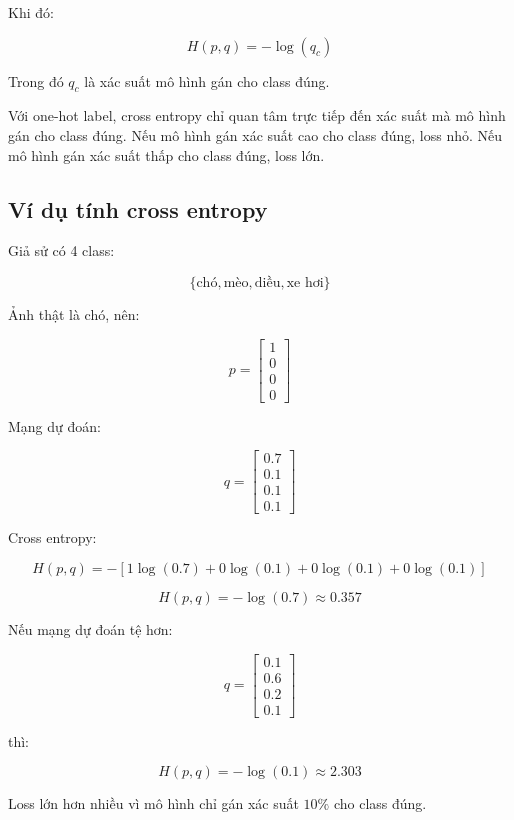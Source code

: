 Khi đó:

\[
    H(p,q) = -\log(q_c)
\]

Trong đó $q_c$ là xác suất mô hình gán cho class đúng.

\begin{ghinho}
Với one-hot label, cross entropy chỉ quan tâm trực tiếp đến xác suất mà mô hình gán cho class đúng. Nếu mô hình gán xác suất cao cho class đúng, loss nhỏ. Nếu mô hình gán xác suất thấp cho class đúng, loss lớn.
\end{ghinho}

\subsection{Ví dụ tính cross entropy}

Giả sử có 4 class:

\[
    \{\text{chó},\text{mèo},\text{diều},\text{xe hơi}\}
\]

Ảnh thật là chó, nên:

\[
    p =
    \begin{bmatrix}
    1\\0\\0\\0
    \end{bmatrix}
\]

Mạng dự đoán:

\[
    q =
    \begin{bmatrix}
    0.7\\
    0.1\\
    0.1\\
    0.1
    \end{bmatrix}
\]

Cross entropy:

\[
    H(p,q) =
    -[1\log(0.7)+0\log(0.1)+0\log(0.1)+0\log(0.1)]
\]

\[
    H(p,q) = -\log(0.7) \approx 0.357
\]

Nếu mạng dự đoán tệ hơn:

\[
    q =
    \begin{bmatrix}
    0.1\\
    0.6\\
    0.2\\
    0.1
    \end{bmatrix}
\]

thì:

\[
    H(p,q)=-\log(0.1)\approx 2.303
\]

Loss lớn hơn nhiều vì mô hình chỉ gán xác suất $10\%$ cho class đúng.

